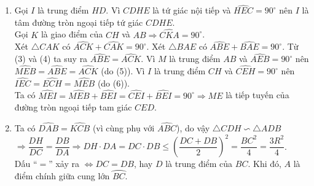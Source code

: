\begin{bt}
{\begin{enumerate}
			Lại có $ \widehat{FHA}=\widehat{ACB} $ (vì cùng bù với góc $ \widehat{EHD} $). 
			Từ (1) và (2) ta suy ra $\widehat{FHA}=\widehat{AFH}\Rightarrow\triangle AFH $ cân tại $ A $.\\
			Mà $ AE\perp FH\Rightarrow AE $ là tia phân giác $ \widehat{FAH} $, hay $ C $ là điểm chính giữa cung $ \wideparen{FN} $.
			\item Gọi $ I $ là trung điểm $ HD $. Vì $ CDHE $ là tứ giác nội tiếp và $ \widehat{HEC}=90^{\circ} $ nên $ I $ là tâm đường tròn ngoại tiếp tứ giác $ CDHE $.\\
			Gọi $ K $ là giao điểm của $ CH $ và $ AB\Rightarrow \widehat{CKA}=90^{\circ} $.\\
			Xét $\triangle CAK $ có $ \widehat{ACK}+\widehat{CAK}=90^{\circ} $. 
			Xét $\triangle BAE $ có $ \widehat{ABE}+\widehat{BAE}=90^{\circ} $. 
			Từ (3) và (4) ta suy ra $ \widehat{ABE}=\widehat{ACK} $. 
			Vì $ M $ là trung điểm $ AB $ và $ \widehat{AEB}=90^{\circ} $ nên $ \widehat{MEB}=\widehat{ABE}=\widehat{ACK} $ (do (5)). 
			Vì $ I $ là trung điểm $ CH $ và $ \widehat{CEH}=90^{\circ} $ nên $ \widehat{IEC}=\widehat{ECH}=\widehat{MEB} $ (do (6)).\\
			Ta có $\widehat{MEI}=\widehat{MEB}+\widehat{BEI}=\widehat{CEI}+\widehat{BEI}=90^{\circ}\Rightarrow ME $ là tiếp tuyến của đường tròn ngoại tiếp tam giác $ CED $.
			\item Ta có $ \widehat{DAB}=\widehat{KCB} $ (vì cùng phụ với $ \widehat{ABC} $), do vậy $ \triangle CDH\backsim \triangle ADB$\\
			$\Rightarrow \dfrac{DH}{DC}=\dfrac{DB}{DA}\Rightarrow DH\cdot DA=DC\cdot DB\leq \left(\dfrac{DC+DB}{2} \right)^{2}=\dfrac{BC^{2}}{4}=\dfrac{3R^{2}}{4}$.\\
			Dấu ``$=$'' xảy ra $\Leftrightarrow DC=DB $, hay $ D $ là trung điểm của $ BC $. Khi đó, $ A $ là điểm chính giữa cung lớn $ \wideparen{BC} $.
		\end{enumerate}
	}
\end{bt}

